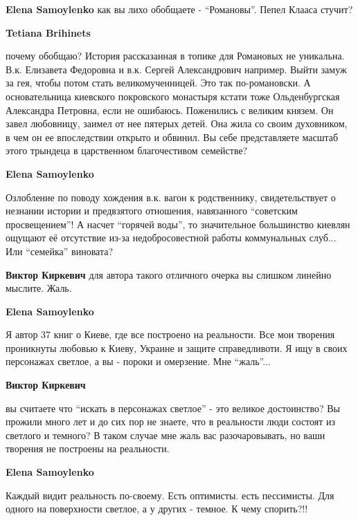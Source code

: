 \begin{itemize}
\begin{itemize}
\begin{itemize}
\textbf{Elena Samoylenko} как вы лихо обобщаете - \enquote{Романовы}. Пепел Клааса стучит?

\textbf{Tetiana Brihinets} 

почему обобщаю? История рассказанная в топике для Романовых не уникальна. В.к.
Елизавета Федоровна и в.к. Сергей Александрович например. Выйти замуж за гея,
чтобы потом стать великомученницей. Это так по-романовски. А основательница
киевского покровского монастыря кстати тоже Ольденбургская Александра Петровна,
если не ошибаюсь. Поженились с великим князем. Он завел любовницу, заимел от
нее пятерых детей. Она жила со своим духовником, в чем он ее впоследствии
открыто и обвинил. Вы себе представляете масштаб этого трындеца в царственном
благочестивом семействе?

\end{itemize} %

\textbf{Elena Samoylenko} 

Озлобление по поводу хождения в.к. вагон к родственнику, свидетельствует о
незнании истории и предвзятого отношения, навязанного \enquote{советским просвещением}!
А насчет \enquote{горячей воды}, то значительное большинство киевлян ощущают её
отсутствие из-за недобросовестной работы коммунальных слуб... Или \enquote{семейка}
виновата?

\begin{itemize} %
\textbf{Виктор Киркевич} для автора такого отличного очерка вы слишком линейно мыслите. Жаль.

\textbf{Elena Samoylenko} 

Я автор 37 книг о Киеве, где все построено на реальности. Все мои творения
проникнуты любовью к Киеву, Украине и защите справедливоти. Я ищу в своих
персонажах светлое, а вы - пороки и омерзение. Мне \enquote{жаль}...

\textbf{Виктор Киркевич} 

вы считаете что \enquote{искать в персонажах светлое} - это великое
достоинство? Вы прожили много лет и до сих пор не знаете, что в реальности люди
состоят из светлого и темного? В таком случае мне жаль вас разочаровывать, но
ваши творения не построены на реальности.


\textbf{Elena Samoylenko} 

Каждый видит реальность по-своему. Есть оптимисты. есть пессимисты. Для одного
на поверхности светлое, а у других - темное. К чему спорить?!!


\end{itemize}
\end{itemize}
\end{itemize}
